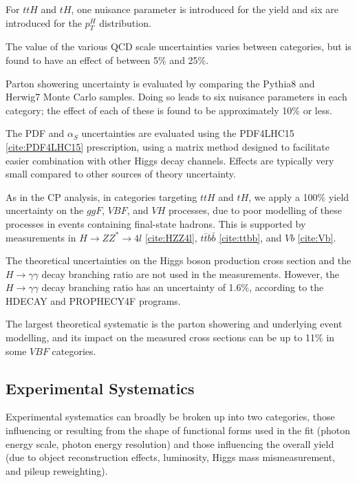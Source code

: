 For $ttH$ and $tH$, one nuisance parameter is introduced for the yield and six are introduced for the $p_{T}^{H}$ distribution.

The value of the various QCD scale uncertainties varies between categories, but is found to have an effect of between 5\% and 25\%.

Parton showering uncertainty is evaluated by comparing the Pythia8 and Herwig7 Monte Carlo samples. Doing so leads to six nuisance parameters in each category; the effect of each of these is found to be approximately 10\% or less.

The PDF and $\alpha_{S}$ uncertainties are evaluated using the PDF4LHC15 \ref{cite:PDF4LHC15} prescription, using a matrix method designed to facilitate easier combination with other Higgs decay channels. Effects are typically very small compared to other sources of theory uncertainty.

As in the CP analysis, in categories targeting $ttH$ and $tH$, we apply a 100\% yield uncertainty on the $ggF$, $VBF$, and $VH$ processes, due to poor modelling of these processes in events containing final-state hadrons. This is supported by measurements in $H \rightarrow ZZ^{*}\rightarrow 4l$ \ref{cite:HZZ4l}, $t\bar{t}b\bar{b}$ \ref{cite:ttbb}, and $Vb$ \ref{cite:Vb}.

The theoretical uncertainties on the Higgs boson production cross section and the $H \rightarrow \gamma \gamma$ decay branching ratio are not used in the measurements. However, the $H \rightarrow \gamma \gamma$ decay branching ratio has an uncertainty of 1.6\%, according to the HDECAY and PROPHECY4F programs.

The largest theoretical systematic is the parton showering and underlying event modelling, and its impact on the measured cross sections can be up to 11\% in some $VBF$ categories. 

\subsection{Experimental Systematics} \label{subsec:Experimentalsysts}

Experimental systematics can broadly be broken up into two categories, those influencing or resulting from the shape of functional forms used in the fit (photon energy scale, photon energy resolution) and those influencing the overall yield (due to object reconstruction effects, luminosity, Higgs mass mismeasurement, and pileup reweighting).

